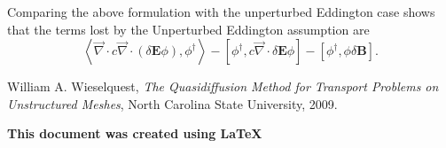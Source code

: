 \documentclass{article}
\newcommand{\bra}{\left\langle}
\newcommand{\ket}{\right\rangle}
\newcommand{\sbra}{\left[}
\newcommand{\sket}{\right]}
\newcommand{\vdiv}{\vec{\nabla} \cdot}
\newcommand{\Edd}{\mathbf{E}}
\newcommand{\BEdd}{\mathbf{B}}
\newcommand{\isigt}{c}
\begin{document}
Comparing the above formulation with the unperturbed Eddington case shows that the terms lost by the Unperturbed Eddington assumption are 
\begin{equation}
\label{EddErr}
 \bra \vdiv \isigt \vdiv \left( \delta \Edd \phi \right), \phi^\dag \ket
- \sbra  \phi^\dag ,\isigt \vdiv \delta \Edd \phi \sket
- \sbra \phi^\dag, \phi \delta \BEdd \sket.
\end{equation} 




\newpage

\begin{thebibliography}{9}


  William A. Wieselquest, \emph{The Quasidiffusion Method for Transport Problems on Unstructured Meshes}, North Carolina State University, 2009.




\end{thebibliography}

\textbf{This document was created using \LaTeX}
\end{document}
